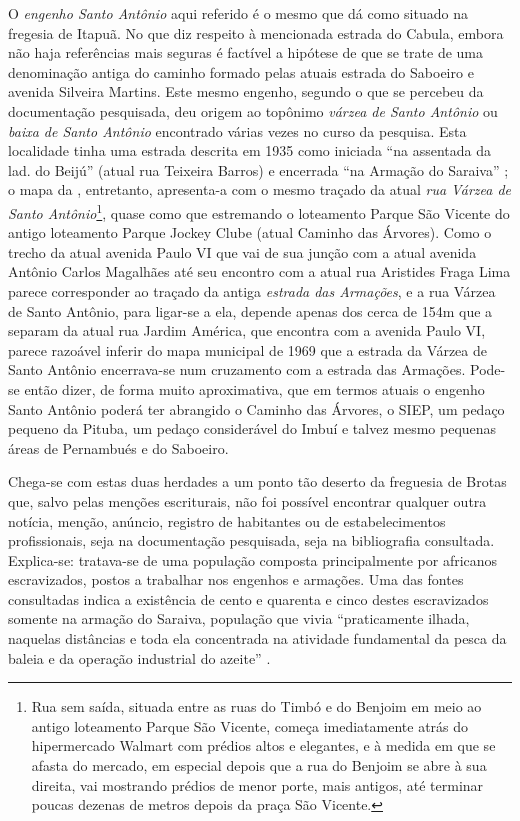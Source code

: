 O \textit{engenho Santo Antônio} aqui referido é o mesmo que  dá como situado na fregesia de Itapuã. No que diz respeito à mencionada estrada do Cabula, embora não haja referências mais seguras é factível a hipótese de que se trate de uma denominação antiga do caminho formado pelas atuais estrada do Saboeiro e avenida Silveira Martins. Este mesmo engenho, segundo o que se percebeu da documentação pesquisada, deu origem ao topônimo \textit{várzea de Santo Antônio} ou \textit{baixa de Santo Antônio} encontrado várias vezes no curso da pesquisa. Esta localidade tinha uma estrada descrita em 1935 como iniciada ``na assentada da lad. do Beijú'' (atual rua Teixeira Barros) e encerrada ``na Armação do Saraiva'' \cite[p.~142]{souza_guia_1935}; o mapa da , entretanto, apresenta-a com o mesmo traçado da atual \textit{rua Várzea de Santo Antônio}\footnote{Rua sem saída, situada entre as ruas do Timbó e do Benjoim em meio ao antigo loteamento Parque São Vicente, começa imediatamente atrás do hipermercado Walmart com prédios altos e elegantes, e à medida em que se afasta do mercado, em especial depois que a rua do Benjoim se abre à sua direita, vai mostrando prédios de menor porte, mais antigos, até terminar poucas dezenas de metros depois da praça São Vicente.}, quase como que estremando o loteamento Parque São Vicente do antigo loteamento Parque Jockey Clube (atual Caminho das Árvores). Como o trecho da atual avenida Paulo VI que vai de sua junção com a atual avenida Antônio Carlos Magalhães até seu encontro com a atual rua Aristides Fraga Lima parece corresponder ao traçado da antiga \textit{estrada das Armações}, e a rua Várzea de Santo Antônio, para ligar-se a ela, depende apenas dos cerca de 154m que a separam da atual rua Jardim América, que encontra com a avenida Paulo VI, parece razoável inferir do mapa municipal de 1969 que a estrada da Várzea de Santo Antônio encerrava-se num cruzamento com a estrada das Armações. Pode-se então dizer, de forma muito aproximativa, que em termos atuais o engenho Santo Antônio poderá ter abrangido o Caminho das Árvores, o SIEP, um pedaço pequeno da Pituba, um pedaço considerável do Imbuí e talvez mesmo pequenas áreas de Pernambués e do Saboeiro.

Chega-se com estas duas herdades a um ponto tão deserto da freguesia de Brotas que, salvo pelas menções escriturais, não foi possível encontrar qualquer outra notícia, menção, anúncio, registro de habitantes ou de estabelecimentos profissionais, seja na documentação pesquisada, seja na bibliografia consultada. Explica-se: tratava-se de uma população composta principalmente por africanos escravizados, postos a trabalhar nos engenhos e armações. Uma das fontes consultadas indica a existência de cento e quarenta e cinco destes escravizados somente na armação do Saraiva, população que vivia ``praticamente ilhada, naquelas distâncias e toda ela concentrada na atividade fundamental da pesca da baleia e da operação industrial do azeite'' \cite[p.~122]{SAMPAIO2005}.

